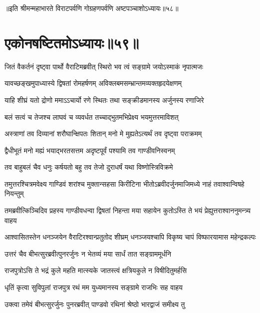 ॥इति श्रीमन्महाभारते विराटपर्वणि गोग्रहणपर्वणि अष्टपञ्चाशोऽध्यायः॥५८॥

\chapter{एकोनषष्टितमोऽध्यायः॥५९॥}

\twolineshloka
{जितं वैकर्तनं दृष्ट्वा पार्थो वैराटिमब्रवीत्}
{स्थिरो भव त्वं सङ्ग्रामे जयोऽस्माकं नृपात्मजः}


\twolineshloka
{यावच्छङ्खमुपाध्यास्ये द्विषतां रोमहर्षणम्}
{अविक्लबमसम्भ्रान्तमव्यक्तहृदयेक्षणम्}



\twolineshloka
{याहि शीघ्रं यतो द्रोणो ममाऽऽचार्यो रणे स्थितः}
{तथा सङ्क्रीडमानस्य अर्जुनस्य रणाजिरे}


\twolineshloka
{बलं सत्वं च तेजश्च लाघवं च व्यवर्धत}
{तच्चाद्भुतमभिप्रेक्ष्य भयमुत्तरमाविशत्}


\twolineshloka
{अस्त्राणां तव दिव्यानां शरौघान्क्षिपतः शितान्}
{मनो मे मुह्यतेऽत्यर्थं तव दृष्ट्वा पराक्रमम्}


\twolineshloka
{द्वैधीभूतं मनो मह्यं भयाद्भरतसत्तम}
{अदृष्टपूर्वं पश्यामि तव गाण्डीवनिस्वनम्}


\twolineshloka
{तव बाहुबलं चैव धनुः कर्षयतो बहु}
{तव तेजो दुराधर्षं यथा विष्णोस्त्रिविक्रमे}



\fourlineindentedshloka
{तमुत्तरश्चित्रमवेक्ष्य गाण्डिवं}
{शरांश्च मुक्तान्सहसा किरीटिना}
{भीतोऽब्रवीदर्जुनमाजिमध्ये}
{नाहं तवाश्वान्विषहे नियन्तुम्}


\fourlineindentedshloka
{तमब्रवीत्किञ्चिदिव प्रहस्य}
{गाण्डीवधन्वा द्विषतां निहन्ता}
{मया सहायेन कुतोऽस्ति ते भयं}
{प्रेह्युत्तराश्वाननुमन्त्र्य वाहय}



\fourlineindentedshloka
{आश्वासितस्तेन धनञ्जयेन}
{वैराटिरश्वान्प्रतुतोद शीघ्रम्}
{धनञ्जयश्चापि विकृष्य चापं}
{विष्फारयामास महेन्द्रकल्पः}


\twolineshloka
{उत्तरं चैव बीभत्सुरब्रवीत्पुनरर्जुनः}
{न भेतव्यं मया सार्धं तात सङ्ग्राममूर्धनि}


\twolineshloka
{राजपुत्रोऽसि ते भद्रं कुले महति मात्स्यके}
{जातस्त्वं क्षत्रियकुले न विषीदितुमर्हसि}


\twolineshloka
{धृतिं कृत्वा सुविपुलां राजपुत्र रथं मम}
{युध्यमानस्य सङ्ग्रामे राजभिः सह वाहय}


\twolineshloka
{उक्त्वा तमेवं बीभत्सुरर्जुनः पुनरब्रवीत्}
{पाण्डवो रथिनां श्रेष्ठो भारद्वाजं समीक्ष्य तु}


